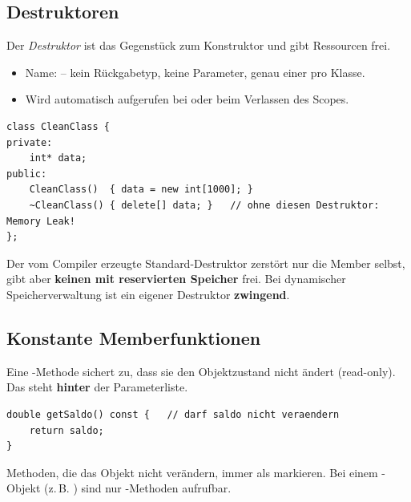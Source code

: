 \subsection{Destruktoren}
Der \emph{Destruktor} ist das Gegenst\"uck zum Konstruktor und gibt Ressourcen frei.
\begin{itemize}
  \item Name:  -- kein R\"uckgabetyp, keine Parameter, genau einer pro Klasse.
  \item Wird automatisch aufgerufen bei  oder beim Verlassen des Scopes.
\end{itemize}
\begin{beispiel}
\begin{lstlisting}
class CleanClass {
private:
    int* data;
public:
    CleanClass()  { data = new int[1000]; }
    ~CleanClass() { delete[] data; }   // ohne diesen Destruktor: Memory Leak!
};
\end{lstlisting}
\end{beispiel}
\begin{merke}
Der vom Compiler erzeugte Standard-Destruktor zerst\"ort nur die Member selbst, gibt aber \textbf{keinen mit  reservierten Speicher} frei. Bei dynamischer Speicherverwaltung ist ein eigener Destruktor \textbf{zwingend}.
\end{merke}

\subsection{Konstante Memberfunktionen}
Eine -Methode sichert zu, dass sie den Objektzustand nicht \"andert (read-only). Das  steht \textbf{hinter} der Parameterliste.
\begin{lstlisting}
double getSaldo() const {   // darf saldo nicht veraendern
    return saldo;
}
\end{lstlisting}
\begin{tipp}
Methoden, die das Objekt nicht ver\"andern, immer als  markieren. Bei einem -Objekt (z.\,B. ) sind nur -Methoden aufrufbar.
\end{tipp}

